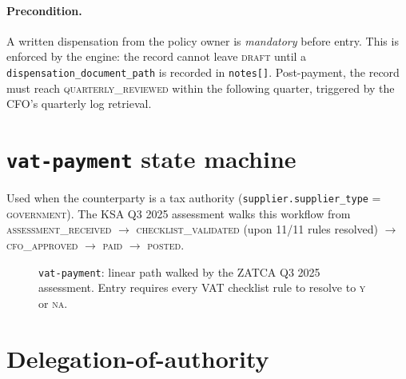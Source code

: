 \documentclass[11pt,a4paper,twoside]{report}
\begin{document}
\paragraph{Precondition.} A written dispensation from the policy owner
is \emph{mandatory} before entry. This is enforced by the engine: the
record cannot leave \textsc{draft} until a
\texttt{dispensation\_document\_path} is recorded in \texttt{notes[]}.
Post-payment, the record must reach \textsc{quarterly\_reviewed} within
the following quarter, triggered by the CFO's quarterly log retrieval.

\section{\texttt{vat-payment} state machine}

Used when the counterparty is a tax authority
(\texttt{supplier.supplier\_type} = \textsc{government}). The KSA Q3
2025 assessment walks this workflow from
\textsc{assessment\_received} $\to$ \textsc{checklist\_validated}
(upon 11/11 rules resolved) $\to$ \textsc{cfo\_approved} $\to$
\textsc{paid} $\to$ \textsc{posted}.

\begin{figure}[htbp]
\centering
{}
\caption{\texttt{vat-payment}: linear path walked by the ZATCA Q3
2025 assessment. Entry requires every VAT checklist rule to resolve
to \textsc{y} or \textsc{na}.}
\label{fig:vat-payment}
\end{figure}

\section{Delegation-of-authority}
\end{document}
